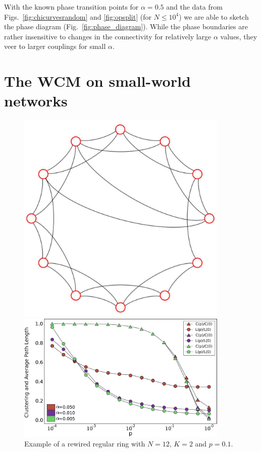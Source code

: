 With the known phase transition points for $\alpha=0.5$ and the data from Figs.~\ref{fig:chicurvesrandom} and \ref{fig:opsplit} (for $N
\leq 10^4$) we are able to sketch the phase diagram (Fig.~\ref{fig:phase_diagram}). While the phase boundaries are rather insensitive
to changes in the connectivity for relatively large $\alpha$ values, they veer to larger couplings for small $\alpha$.


\section{\label{smallworld} The WCM on small-world networks}


\begin{figure}[b]
    \centering
    \begin{minipage}[t]{0.33\textwidth}
        \centering
        \includegraphics[width=0.9\textwidth]{fig/chap2/rewiredring.eps}
        \caption{\label{fig:rewiredring} Example of a rewired regular ring with $N=12$, $K=2$ and $p=0.1$.  }
    \end{minipage}
    \hfill
    \begin{minipage}[t]{0.62\textwidth}
        \centering
        \includegraphics[width=0.9\textwidth]{fig/chap2/small-world.eps}

\end{minipage}
\end{figure}
